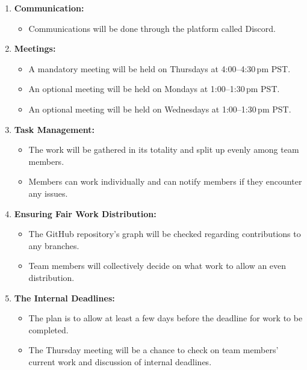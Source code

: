 \documentclass[10pt,letterpaper]{article}
\begin{document}
\begin{enumerate}

\vspace{1em}

\item \textbf{Communication:}
      \begin{itemize}[leftmargin=*]
      \item Communications will be done through the platform called Discord.
      \end{itemize}

\item \textbf{Meetings:}
      \begin{itemize}[leftmargin=*]
      \item A mandatory meeting will be held on Thursdays at 4:00--4:30\,pm PST.
      \item An optional meeting will be held on Mondays at 1:00--1:30\,pm PST.
      \item An optional meeting will be held on Wednesdays at 1:00--1:30\,pm PST.
      \end{itemize}

\item \textbf{Task Management:}
      \begin{itemize}[leftmargin=*]
      \item The work will be gathered in its totality and split up evenly among team members.
      \item Members can work individually and can notify members if they encounter any issues.
      \end{itemize}

\item \textbf{Ensuring Fair Work Distribution:}
      \begin{itemize}[leftmargin=*]
      \item The GitHub repository’s graph will be checked regarding contributions to any branches.
      \item Team members will collectively decide on what work to allow an even distribution.
      \end{itemize}

\item \textbf{The Internal Deadlines:}
      \begin{itemize}[leftmargin=*]
      \item The plan is to allow at least a few days before the deadline for work to be completed.
      \item The Thursday meeting will be a chance to check on team members’ current work and discussion of internal deadlines.
      \end{itemize}


\end{enumerate}
\end{document}
